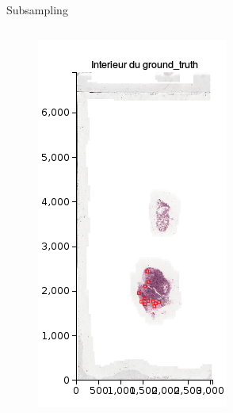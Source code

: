 \documentclass{beamer}
\begin{document}
\begin{frame}{Subsampling}

\begin{columns}[T] %
\begin{column}{.25\textwidth}
\begin{figure}[!ht]
\centering
\includegraphics[width=\textwidth]{OnlyPositive.png}

\end{figure}
\end{column}
\end{columns}
\end{frame}
\end{document}
